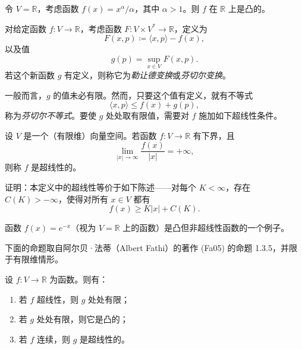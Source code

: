 \begin{example}
\label{ex:power-function-convexity}
令 $V=\mathbb R$，考虑函数 $f(x)=x^\alpha/\alpha$，其中 $\alpha>1$。则 $f$ 在 $\mathbb R$ 上是凸的。
\end{example}

对给定函数 $f:V\to\mathbb R$，考虑函数 $F:V\times V^*\to\mathbb R$，定义为
\[
  F(x,p)\coloneqq\langle x,p\rangle-f(x),
\]
以及值
\begin{equation}\label{eq:legendre-transform-supremum}
  g(p)=\sup_{x\in V}F(x,p).
\end{equation}
若这个新函数 $g$ 有定义，则称它为\emph{勒让德变换}或\emph{芬切尔变换}。

一般而言，$g$ 的值未必有限。然而，只要这个值有定义，就有不等式
\begin{equation}\label{eq:fenchel-inequality}
  \langle x,p\rangle\leq f(x)+g(p),
\end{equation}
称为\emph{芬切尔不等式}。要使 $g$ 处处取有限值，需要对 $f$ 施加如下超线性条件。

\begin{definition}
\label{def:superlinear-function}
设 $V$ 是一个（有限维）向量空间。若函数 $f:V\to\mathbb R$ 有下界，且
\begin{equation}\label{eq:superlinear-function}
  \lim_{|x|\to\infty}\frac{f(x)}{|x|}=+\infty,
\end{equation}
则称 $f$ 是超线性的。
\end{definition}

\begin{exercise}
\label{ex:superlinearity-equivalence}
证明：本定义中的超线性等价于如下陈述——对每个 $K<\infty$，存在 $C(K)>-\infty$，使得对所有 $x\in V$ 都有
\[
  f(x)\geq K|x|+C(K).
\]
\end{exercise}

函数 $f(x)=e^{-x}$（视为 $V=\mathbb R$ 上的函数）是凸但非超线性函数的一个例子。

下面的命题取自阿尔贝·法蒂（Albert Fathi）的著作 (Fa05) 的命题 1.3.5，并限于有限维情形。

\begin{proposition}
\label{prop:legendre-basic-properties}
设 $f:V\to\mathbb R$ 为函数。则有：
\begin{enumerate}[label=(\arabic*)]
  \item 若 $f$ 超线性，则 $g$ 处处有限；
  \item 若 $g$ 处处有限，则它是凸的；
  \item 若 $f$ 连续，则 $g$ 是超线性的。
\end{enumerate}
\end{proposition}

